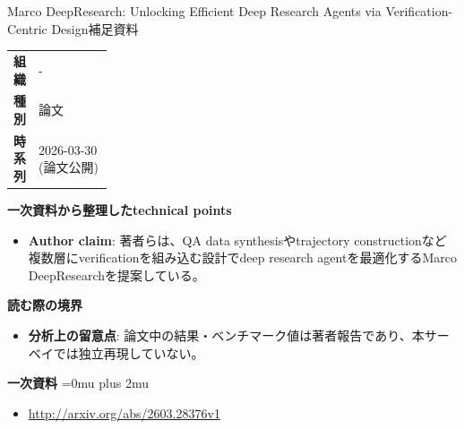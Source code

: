 \begin{technicalnote}{Marco DeepResearch: Unlocking Efficient Deep Research Agents via Verification-Centric Design}{補足資料}
\begingroup
\begin{tabularx}{\linewidth}{@{}>{\bfseries}p{0.22\linewidth}X@{}}
組織 & - \\
種別 & 論文 \\
時系列 & 2026-03-30 (論文公開) \\
\end{tabularx}
\smallskip
{\bfseries 一次資料から整理したtechnical points}
\begin{itemize}[leftmargin=1.5em,itemsep=0.35em]
\item \textbf{Author claim}: 著者らは、QA data synthesisやtrajectory constructionなど複数層にverificationを組み込む設計でdeep research agentを最適化するMarco DeepResearchを提案している。
\end{itemize}
\begin{minipage}{\linewidth}
{\bfseries 読む際の境界}
\begin{itemize}[leftmargin=1.5em,itemsep=0.35em]
\item \textbf{分析上の留意点}: 論文中の結果・ベンチマーク値は著者報告であり、本サーベイでは独立再現していない。
\end{itemize}
\begin{samepage}
{\bfseries 一次資料}
\begingroup\sloppy
\Urlmuskip=0mu plus 2mu\relax
\begin{itemize}[leftmargin=1.5em,itemsep=0.25em]
\item {\scriptsize\url{http://arxiv.org/abs/2603.28376v1}}
\end{itemize}
\endgroup
\end{samepage}
\end{minipage}
\endgroup
\end{technicalnote}
\medskip

